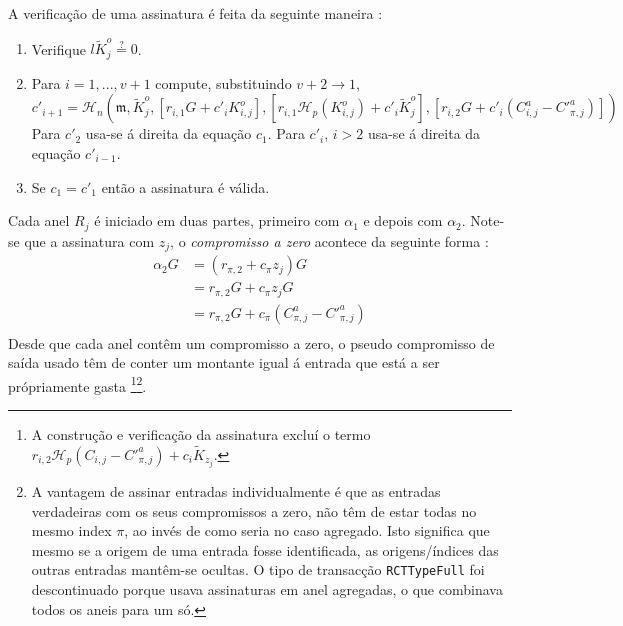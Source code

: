 A verificação de uma assinatura é feita da seguinte maneira :

\begin{enumerate}

    \item Verifique \(l \tilde{K}^o_j \stackrel{?}{=} 0\).

	\item Para \(i = 1, ..., v+1\) compute, substituindo \(v+2 \rightarrow 1\),
\[c'_{i+1} = \mathcal{H}_n(\mathfrak{m}, \tilde{K}^o_j, [r_{i, 1} G + c'_i K^o_{i, j}], [r_{i, 1} \mathcal{H}_p(K^o_{i, j}) + c'_i \tilde{K}^o_j], [r_{i, 2}G + c'_i (C^a_{i, j} - C'^a_{\pi, j})])\]
    Para $c'_2$ usa-se á direita da equação $c_1$.\newline
    Para $c'_i$, $i>2$ usa-se á direita da equação $c'_{i-1}$. 
	\item Se \(c_1 = c'_1\) então a assinatura é válida.

\end{enumerate}
Cada anel $R_j$ é iniciado em duas partes, primeiro com $\alpha_{1}$ e depois com $\alpha_{2}$. Note-se que a assinatura com $z_j$, o {\em compromisso a zero} acontece da seguinte forma :
\begin{align*}
 \alpha_2 G &= (r_{\pi, 2} + c_{\pi} z_j)G\\
            &= r_{\pi, 2}G + c_{\pi} z_j G\\
            &= r_{\pi, 2}G + c_{\pi} (C^a_{\pi, j} - C'^a_{\pi, j})\\
\end{align*}
Desde que cada anel contêm um compromisso a zero, o pseudo compromisso de saída usado têm de conter um montante igual á entrada que está a ser própriamente gasta \footnote{
A construção e verificação da assinatura excluí o termo $r_{i,2} \mathcal{H}_p(C_{i, j} - C'^a_{\pi, j}) + c_i \tilde{K}_{z_j}$.}\footnote{A vantagem de assinar entradas individualmente é que as entradas verdadeiras com os seus compromissos a zero, não têm de estar todas no mesmo index $\pi$, ao invés de como seria no caso agregado. Isto significa que mesmo se a origem de uma entrada fosse identificada, as origens/índices das outras entradas mantêm-se ocultas. O tipo de transacção {\tt RCTTypeFull} foi descontinuado porque usava assinaturas em anel agregadas, o que combinava todos os aneis para um só.}.


